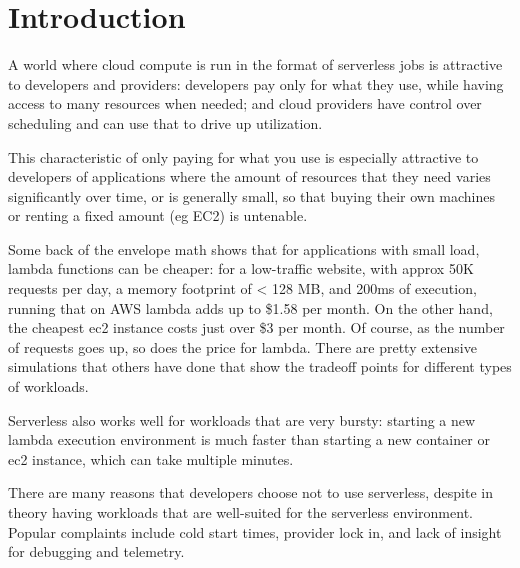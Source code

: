 \section{Introduction}

A world where cloud compute is run in the format of serverless jobs is
attractive to developers and providers: developers pay only for what they use,
while having access to many resources when needed; and cloud providers have
control over scheduling and can use that to drive up utilization.



This characteristic of only paying for what you use is especially attractive to
developers of applications where the amount of resources that they need varies
significantly over time, or is generally small, so that buying their own
machines or renting a fixed amount (eg EC2) is untenable.

Some back of the envelope math shows that for applications with small load,
lambda functions can be cheaper: for a low-traffic website, with approx 50K
requests per day, a memory footprint of < 128 MB, and 200ms of execution,
running that on AWS lambda adds up to \$1.58 per month. On the other hand, the
cheapest ec2 instance costs just over \$3 per month. Of course, as the number of
requests goes up, so does the price for lambda. There are pretty extensive
simulations that others have done that show the tradeoff points for different
types of workloads.

Serverless also works well for workloads that are very bursty: starting a new
lambda execution environment is much faster than starting a new container or ec2
instance, which can take multiple minutes.



There are many reasons that developers choose not to use serverless, despite in
theory having workloads that are well-suited for the serverless environment.
Popular complaints include cold start times, provider lock in, and lack of
insight for debugging and telemetry.

